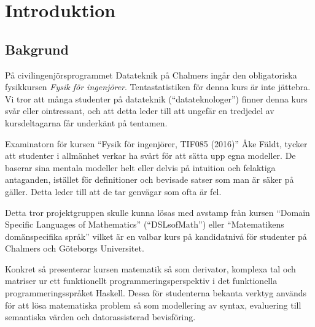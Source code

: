 
\chapter{Introduktion}

\section{Bakgrund}

\begin{draft}

På civilingenjörsprogrammet Datateknik på Chalmers ingår den obligatoriska fysikkursen
\textit{Fysik för ingenjörer}. Tentastatistiken för denna kurs är
inte jättebra\cite{tentastatistik}. Vi
tror att många studenter på datateknik (``datateknologer'') finner denna kurs
svår eller ointressant, och att detta leder till att ungefär en
tredjedel av kursdeltagarna får underkänt på tentamen.

Examinatorn för kursen ``Fysik för ingenjörer, TIF085 (2016)'' Åke Fäldt, tycker
att studenter i allmänhet verkar ha svårt för att sätta upp egna
modeller. De baserar sina mentala modeller helt eller delvis på
intuition och felaktiga antaganden, istället för definitioner och
bevisade satser som man är säker på gäller. Detta leder till att de
tar genvägar som ofta är fel.

Detta tror projektgruppen skulle kunna lösas med avstamp från kursen ``Domain Specific Languages of
Mathematics'' (``DSLsofMath'') eller ``Matematikens domänspecifika språk''
vilket är en valbar kurs på kandidatnivå för studenter på Chalmers och
Göteborgs Universitet.

\iffalse
Domänspecifika språk, kan
förklaras som ett språk konstruerat för ett specifikt område, d.v.s. en
domän. Språket kan användas för att enklare uttrycka uttryck inom
domänen, till exempel Newtons andra lag $F=m \cdot a$, än vad som är
möjligt inom generella (programmerings) språk. Exemplet ovan kan i ett 
domänspecifikt språk evalueras enklare m.h.a. ett syntaxträd och mönstermatchning,
gentemot ett generellt språk där exempelvis en rekursiv swith-case sats skulle kunna användas. 
Dock med mer overhead\todo{Visa bild på syntaxträd för m * a}. 
\fi

Konkret så presenterar kursen matematik så som derivator, komplexa
tal och matriser ur ett funktionellt programmeringsperspektiv i det funktionella programmeringsspråket
Haskell. Dessa för studenterna bekanta verktyg används för att lösa
matematiska problem så som modellering av syntax, evaluering till
semantiska värden och datorassisterad bevisföring.



\end{draft}
